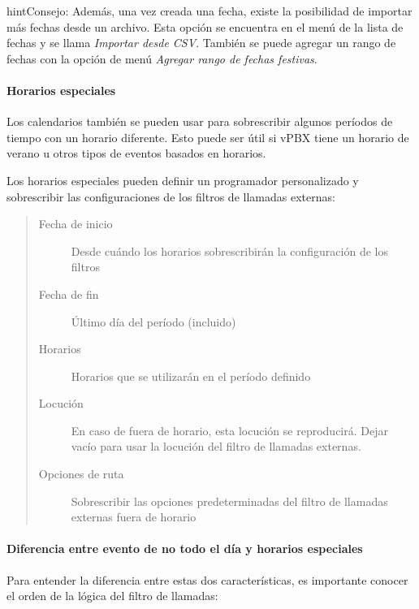 \documentclass[letterpaper,10pt,spanish]{sphinxmanual}
\begin{document}
\begin{notice}{hint}{Consejo:}
Además, una vez creada una fecha, existe la posibilidad de importar más fechas desde un archivo. Esta opción se encuentra en el menú de la lista de fechas y se llama \emph{Importar desde CSV}. También se puede agregar un rango de fechas con la opción de menú \emph{Agregar rango de fechas festivas}.
\end{notice}


\paragraph{Horarios especiales}
\label{administration_portal/client/vpbx/routing_tools/calendars:id2}\label{administration_portal/client/vpbx/routing_tools/calendars:special-schedules}
Los calendarios también se pueden usar para sobrescribir algunos períodos de tiempo con un horario diferente. Esto puede ser útil si vPBX tiene un horario de verano u otros tipos de eventos basados en horarios.

Los horarios especiales pueden definir un programador personalizado y sobrescribir las configuraciones de los filtros de llamadas externas:
\begin{quote}
\begin{description}
\item[{Fecha de inicio}] \leavevmode
Desde cuándo los horarios sobrescribirán la configuración de los filtros

\item[{Fecha de fin}] \leavevmode
Último día del período (incluido)

\item[{Horarios}] \leavevmode
Horarios que se utilizarán en el período definido

\item[{Locución}] \leavevmode
En caso de fuera de horario, esta locución se reproducirá. Dejar vacío para usar la locución del filtro de llamadas externas.

\item[{Opciones de ruta}] \leavevmode
Sobrescribir las opciones predeterminadas del filtro de llamadas externas fuera de horario

\end{description}
\end{quote}


\paragraph{Diferencia entre evento de no todo el día y horarios especiales}
\label{administration_portal/client/vpbx/routing_tools/calendars:difference-between-non-whole-day-event-and-special-schedules}
Para entender la diferencia entre estas dos características, es importante conocer el orden de la lógica del filtro de llamadas:
\end{document}

